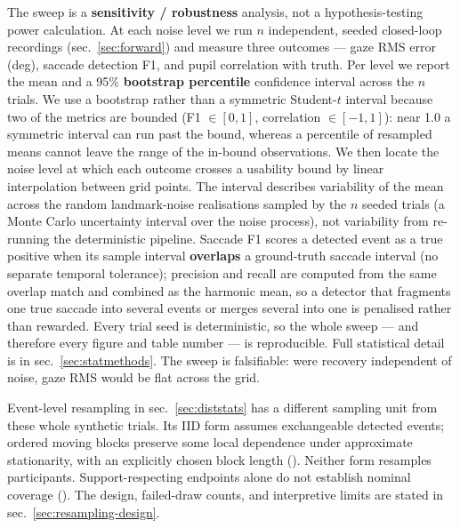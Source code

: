 \documentclass[
]{article}
\begin{document}
The sweep is a \textbf{sensitivity / robustness} analysis, not a
hypothesis-testing power calculation. At each noise level we run \(n\)
independent, seeded closed-loop recordings (sec.~\ref{sec:forward}) and
measure three outcomes --- gaze RMS error (deg), saccade detection F1,
and pupil correlation with truth. Per level we report the mean and a
95\% \textbf{bootstrap percentile} confidence interval across the \(n\)
trials. We use a bootstrap rather than a symmetric Student-\(t\)
interval because two of the metrics are bounded (F1 \(\in[0,1]\),
correlation \(\in[-1,1]\)): near 1.0 a symmetric interval can run past
the bound, whereas a percentile of resampled means cannot leave the
range of the in-bound observations. We then locate the noise level at
which each outcome crosses a usability bound by linear interpolation
between grid points. The interval describes variability of the mean
across the random landmark-noise realisations sampled by the \(n\)
seeded trials (a Monte Carlo uncertainty interval over the noise
process), not variability from re-running the deterministic pipeline.
Saccade F1 scores a detected event as a true positive when its sample
interval \textbf{overlaps} a ground-truth saccade interval (no separate
temporal tolerance); precision and recall are computed from the same
overlap match and combined as the harmonic mean, so a detector that
fragments one true saccade into several events or merges several into
one is penalised rather than rewarded. Every trial seed is
deterministic, so the whole sweep --- and therefore every figure and
table number --- is reproducible. Full statistical detail is in
sec.~\ref{sec:statmethods}. The sweep is falsifiable: were recovery
independent of noise, gaze RMS would be flat across the grid.

Event-level resampling in sec.~\ref{sec:diststats} has a different
sampling unit from these whole synthetic trials. Its IID form assumes
exchangeable detected events; ordered moving blocks preserve some local
dependence under approximate stationarity, with an explicitly chosen
block length (). Neither
form resamples participants. Support-respecting endpoints alone do not
establish nominal coverage ().
The design, failed-draw counts, and interpretive limits are stated in
sec.~\ref{sec:resampling-design}.
\end{document}
